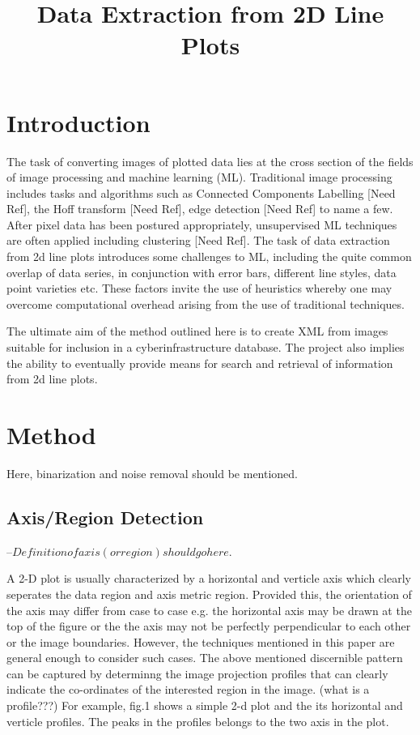 \documentclass[12pt]{article}
\begin{document}
\title{Data Extraction from 2D Line Plots}
\section{Introduction}
 The task of converting images of plotted data lies at the cross section of  the fields of  image processing and machine learning (ML). Traditional image processing  includes tasks and algorithms such as Connected Components Labelling [Need Ref], the Hoff transform [Need Ref], edge detection [Need Ref] to name a few. After pixel data has been postured appropriately, unsupervised ML techniques are often applied including clustering [Need Ref]. The task of data extraction from 2d line plots introduces some  challenges to ML, including the quite common overlap of data series, in conjunction with error bars, different line styles, data point varieties etc. These factors invite the use of heuristics whereby one may overcome computational overhead arising from the use of traditional techniques.


 The ultimate aim of the method outlined here is to create XML from images suitable for inclusion in a cyberinfrastructure database. The project also implies the ability to eventually provide means for search and retrieval of information from 2d line plots.

\section{Method}

Here, binarization and noise removal should be mentioned. 

\subsection{Axis/Region Detection}

--$ Definition of axis (or region) should go here.$ 

A 2-D plot is usually characterized by a horizontal and verticle axis which clearly seperates the data region and axis metric region.
Provided this, the orientation of the axis may differ from case to case e.g. the horizontal axis may be drawn at the top of the figure
or the the axis may not be perfectly perpendicular to each other or the image boundaries. However, the techniques mentioned in this paper
are general enough to consider such cases. The above mentioned discernible pattern can be captured by determinng the image projection profiles
that can clearly indicate the co-ordinates of the interested region in the image. (what is a profile???) For example, fig.1 shows a simple 2-d plot
and the its horizontal and verticle profiles. The peaks in the profiles belongs to the two axis in the plot.
\end{document}

